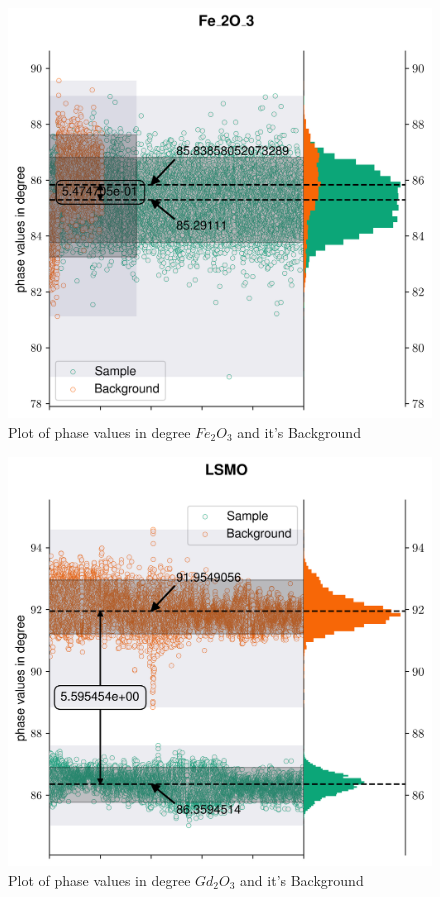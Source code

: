 \begin{figure}[hbt!]
\includegraphics[width= \linewidth]{plots/fe2o3T.png}
\caption{Plot of phase values in degree $Fe_2O_3$ and it's Background}
\label{fig:Tdata1}
\end{figure}
\begin{figure}[hbt!]
  \includegraphics[width= \linewidth]{plots/LSMOT.png}
  \caption{Plot of phase values in degree $Gd_2O_3$ and it's Background}
  \label{fig:Tdata2}
\end{figure}

